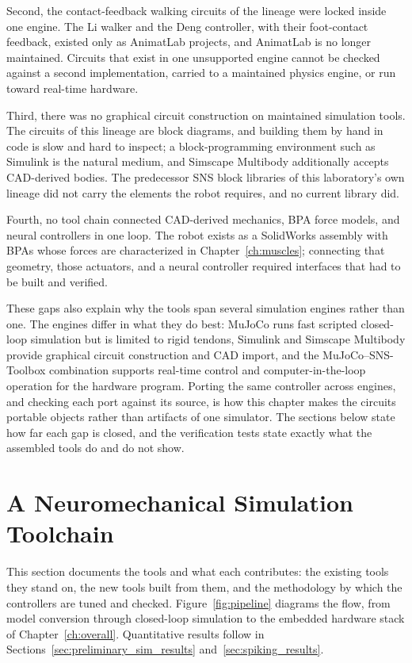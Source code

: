 Second, the contact-feedback walking circuits of the lineage were locked inside one engine. The Li walker and the Deng controller, with their foot-contact feedback, existed only as AnimatLab projects, and AnimatLab is no longer maintained. Circuits that exist in one unsupported engine cannot be checked against a second implementation, carried to a maintained physics engine, or run toward real-time hardware.

Third, there was no graphical circuit construction on maintained simulation tools. The circuits of this lineage are block diagrams, and building them by hand in code is slow and hard to inspect; a block-programming environment such as Simulink is the natural medium, and Simscape Multibody additionally accepts CAD-derived bodies. The predecessor SNS block libraries of this laboratory's own lineage \citep{hunt_development_2017, young_analyzing_2019} did not carry the elements the robot requires, and no current library did.

Fourth, no tool chain connected CAD-derived mechanics, BPA force models, and neural controllers in one loop. The robot exists as a SolidWorks assembly with BPAs whose forces are characterized in Chapter~\ref{ch:muscles}; connecting that geometry, those actuators, and a neural controller required interfaces that had to be built and verified.

These gaps also explain why the tools span several simulation engines rather than one. The engines differ in what they do best: MuJoCo runs fast scripted closed-loop simulation but is limited to rigid tendons, Simulink and Simscape Multibody provide graphical circuit construction and CAD import, and the MuJoCo--SNS-Toolbox combination supports real-time control and computer-in-the-loop operation for the hardware program. Porting the same controller across engines, and checking each port against its source, is how this chapter makes the circuits portable objects rather than artifacts of one simulator. The sections below state how far each gap is closed, and the verification tests state exactly what the assembled tools do and do not show.

\section{A Neuromechanical Simulation Toolchain}\label{sec:preliminary_sim_methods}

This section documents the tools and what each contributes: the existing tools they stand on, the new tools built from them, and the methodology by which the controllers are tuned and checked. Figure~\ref{fig:pipeline} diagrams the flow, from model conversion through closed-loop simulation to the embedded hardware stack of Chapter~\ref{ch:overall}. Quantitative results follow in Sections~\ref{sec:preliminary_sim_results} and~\ref{sec:spiking_results}.

